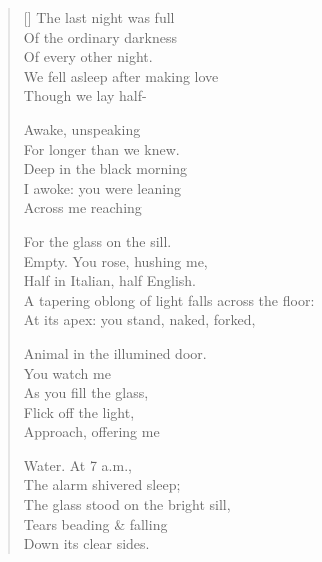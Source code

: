 \label{ch:last_night}
\settowidth{\versewidth}{A tapering oblong of light falls across the floor:}
\begin{verse}[\versewidth]
The last night was full\\
Of the ordinary darkness\\
Of every other night.\\
We fell asleep after making love\\
Though we lay half-

Awake, unspeaking\\
For longer than we knew.\\
Deep in the black morning\\
I awoke: you were leaning\\
Across me reaching

For the glass on the sill.\\
Empty. You rose, hushing me,\\
Half in Italian, half English.\\
A tapering oblong of light falls across the floor:\\
At its apex: you stand, naked, forked,

Animal in the illumined door.\\
You watch me\\
As you fill the glass,\\
Flick off the light,\\
Approach, offering me

Water.               At 7 a.m.,\\
The alarm shivered sleep;\\
The glass stood on the bright sill,\\
Tears beading \& falling\\
Down its clear sides.
\end{verse}
